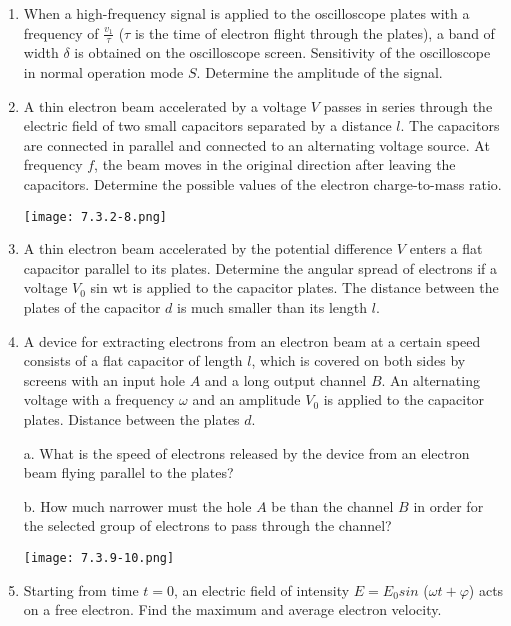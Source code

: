 \documentclass{article}
\begin{document}
\begin{enumerate}[label=7.3.\arabic*]
\item When a high-frequency signal is applied to the oscilloscope plates with a frequency of $\frac{v_1}{\tau}$ ($\tau$ is the time of electron flight through the plates), a band of width $\delta$ is obtained on the oscilloscope screen. Sensitivity of the oscilloscope in normal operation mode $S$. Determine the amplitude of the signal.

\item A thin electron beam accelerated by a voltage $V$ passes in series through the electric field of two small capacitors separated by a distance $l$. The capacitors are connected in parallel and connected to an alternating voltage source. At frequency $f$, the beam moves in the original direction after leaving the capacitors. Determine the possible values of the electron charge-to-mass ratio.

\begin{center}
    \texttt{[image: 7.3.2-8.png]}
\end{center}


\item A thin electron beam accelerated by the potential difference $V$ enters a flat capacitor parallel to its plates. Determine the angular spread of electrons if a voltage $V_0$ sin wt is applied to the capacitor plates. The distance between the plates of the capacitor $d$ is much smaller than its length $l$.

\item A device for extracting electrons from an electron beam at a certain speed consists of a flat capacitor of length $l$, which is covered on both sides by screens with an input hole $A$ and a long output channel $B$. An alternating voltage with a frequency $\omega$ and an amplitude $V_0$ is applied to the capacitor plates. Distance between the plates $d$.

a. What is the speed of electrons released by the device from an electron beam flying parallel to the plates? 

b. How much narrower must the hole $A$ be than the channel $B$ in order for the selected group of electrons to pass through the channel?


\begin{center}
    \texttt{[image: 7.3.9-10.png]}
\end{center}


\item Starting from time $t = 0$, an electric field of intensity $E = E_0 sin$ ($\omega t + \varphi$) acts on a free electron. Find the maximum and average electron velocity.


\end{enumerate}
\end{document}
